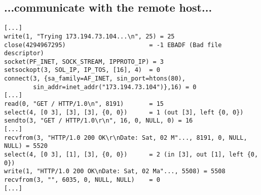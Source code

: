 \documentclass[xga]{xdvislides}
\begin{document}
\subsection{...communicate with the remote host...}
\begin{verbatim}
[...]
write(1, "Trying 173.194.73.104...\n", 25) = 25
close(4294967295)                       = -1 EBADF (Bad file descriptor)
socket(PF_INET, SOCK_STREAM, IPPROTO_IP) = 3
setsockopt(3, SOL_IP, IP_TOS, [16], 4)  = 0
connect(3, {sa_family=AF_INET, sin_port=htons(80),
        sin_addr=inet_addr("173.194.73.104")},16) = 0
[...]
read(0, "GET / HTTP/1.0\n", 8191)       = 15
select(4, [0 3], [3], [3], {0, 0})      = 1 (out [3], left {0, 0})
sendto(3, "GET / HTTP/1.0\r\n", 16, 0, NULL, 0) = 16
[...]
recvfrom(3, "HTTP/1.0 200 OK\r\nDate: Sat, 02 M"..., 8191, 0, NULL, NULL) = 5520
select(4, [0 3], [1], [3], {0, 0})      = 2 (in [3], out [1], left {0, 0})
write(1, "HTTP/1.0 200 OK\nDate: Sat, 02 Ma"..., 5508) = 5508
recvfrom(3, "", 6035, 0, NULL, NULL)    = 0
[...]
\end{verbatim}


\end{document}
